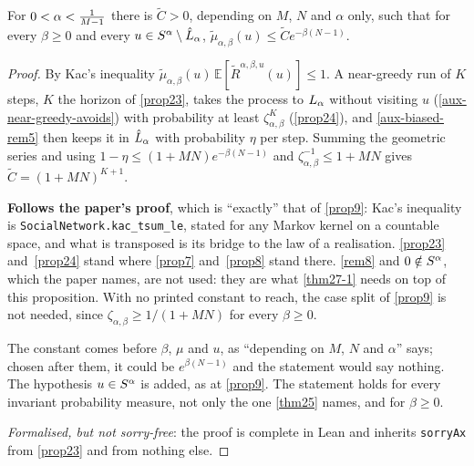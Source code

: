 \begin{proposition}
  \label{prop26}
  \leanok
  For $0 < \alpha < \tfrac{1}{M-1}$ there is $\tilde{C} > 0$, depending on $M$, $N$
  and $\alpha$ only, such that for every $\beta \ge 0$ and every
  $u \in S^\alpha \setminus \hat{L}_\alpha$,
  $\tilde{\mu}_{\alpha,\beta}(u) \le \tilde{C} e^{-\beta(N-1)}$.
\end{proposition}
\begin{proof}
  \leanok
  By Kac's inequality $\tilde{\mu}_{\alpha,\beta}(u)\,
  \mathbb{E}[\tilde{R}^{\alpha,\beta,u}(u)] \le 1$.  A near-greedy run of $K$
  steps, $K$ the horizon of \ref{prop23}, takes the process to $L_\alpha$
  without visiting $u$ (\ref{aux-near-greedy-avoids}) with probability at least
  $\zeta_{\alpha,\beta}^K$ (\ref{prop24}), and \ref{aux-biased-rem5} then keeps
  it in $\hat{L}_\alpha$ with probability $\eta$ per step.  Summing the geometric
  series and using $1 - \eta \le (1+MN) e^{-\beta(N-1)}$ and
  $\zeta_{\alpha,\beta}^{-1} \le 1 + MN$ gives $\tilde{C} = (1+MN)^{K+1}$.

  \textbf{Follows the paper's proof}, which is ``exactly'' that of \ref{prop9}:
  Kac's inequality is \texttt{SocialNetwork.kac\_tsum\_le}, stated for any
  Markov kernel on a countable space, and what is transposed is its bridge to
  the law of a realisation.  \ref{prop23} and~\ref{prop24} stand where
  \ref{prop7} and~\ref{prop8} stand there.  \ref{rem8} and $0 \notin S^\alpha$,
  which the paper names, are not used: they are what \ref{thm27-1} needs on top
  of this proposition.  With no printed constant to reach, the case split of
  \ref{prop9} is not needed, since $\zeta_{\alpha,\beta} \ge 1/(1+MN)$ for every
  $\beta \ge 0$.

  The constant comes before $\beta$, $\mu$ and $u$, as ``depending on $M$, $N$
  and $\alpha$'' says; chosen after them, it could be $e^{\beta(N-1)}$ and the
  statement would say nothing.  The hypothesis $u \in
  S^\alpha$ is added, as at \ref{prop9}.  The statement holds for every invariant
  probability measure, not only the one \ref{thm25} names, and for $\beta \ge
  0$.

  \emph{Formalised, but not sorry-free}: the proof is complete in Lean and
  inherits \texttt{sorryAx} from \ref{prop23} and from nothing else.
\end{proof}

